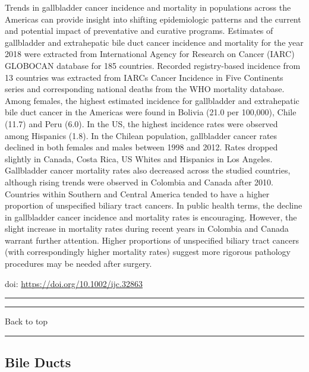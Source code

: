 \documentclass[
]{article}
\begin{document}
Trends in gallbladder cancer incidence and mortality in populations
across the Americas can provide insight into shifting epidemiologic
patterns and the current and potential impact of preventative and
curative programs. Estimates of gallbladder and extrahepatic bile duct
cancer incidence and mortality for the year 2018 were extracted from
International Agency for Research on Cancer (IARC) GLOBOCAN database for
185 countries. Recorded registry-based incidence from 13 countries was
extracted from IARCs Cancer Incidence in Five Continents series and
corresponding national deaths from the WHO mortality database. Among
females, the highest estimated incidence for gallbladder and
extrahepatic bile duct cancer in the Americas were found in Bolivia
(21.0 per 100,000), Chile (11.7) and Peru (6.0). In the US, the highest
incidence rates were observed among Hispanics (1.8). In the Chilean
population, gallbladder cancer rates declined in both females and males
between 1998 and 2012. Rates dropped slightly in Canada, Costa Rica, US
Whites and Hispanics in Los Angeles. Gallbladder cancer mortality rates
also decreased across the studied countries, although rising trends were
observed in Colombia and Canada after 2010. Countries within Southern
and Central America tended to have a higher proportion of unspecified
biliary tract cancers. In public health terms, the decline in
gallbladder cancer incidence and mortality rates is encouraging.
However, the slight increase in mortality rates during recent years in
Colombia and Canada warrant further attention. Higher proportions of
unspecified biliary tract cancers (with correspondingly higher mortality
rates) suggest more rigorous pathology procedures may be needed after
surgery.

doi: \url{https://doi.org/10.1002/ijc.32863}

\begin{center}\rule{0.5\linewidth}{0.5pt}\end{center}

\begin{center}\rule{0.5\linewidth}{0.5pt}\end{center}

Back to top

\begin{center}\rule{0.5\linewidth}{0.5pt}\end{center}

\pagebreak

\hypertarget{bileducts}{%
\subsection{Bile Ducts}\label{bileducts}}
\end{document}
